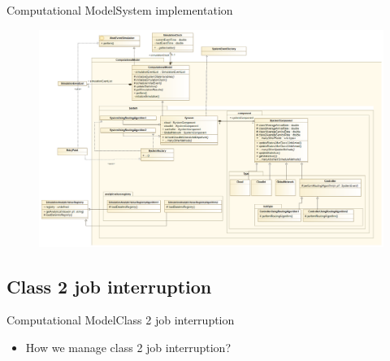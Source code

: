 \documentclass[10pt]{beamer}
\begin{document}
\begin{frame}{Computational Model}{System implementation}
\begin{figure}
\centering
\includegraphics[width=\textwidth]{./images/ClassDiagram.png}
\label{fig:Concorrente}
\end{figure}
\end{frame}


\subsection{Class 2 job interruption}
\begin{frame}{Computational Model}{Class 2 job interruption}

\begin{itemize}
\item How we manage class 2 job interruption?
\end{itemize}
\end{frame}

\end{document}
